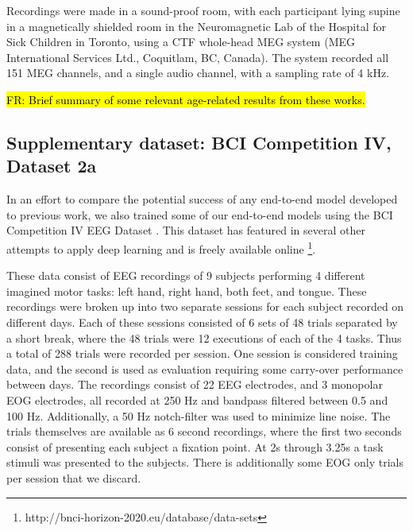 \documentclass[utf8]{frontiersSCNS} %
\newcommand{\FR}[1]{{\small \textcolor{red}{\hl{FR: #1}}}}
\begin{document}
Recordings were made in a sound-proof room, with each participant lying supine in a magnetically shielded room in the Neuromagnetic Lab of the Hospital for Sick Children in Toronto, using a CTF whole-head MEG system (MEG International Services Ltd., Coquitlam, BC, Canada). The system recorded all 151 MEG channels, and a single audio channel, with a sampling rate of 4 kHz.

\FR{Brief summary of some relevant age-related results from these works.}

\subsection{Supplementary dataset: BCI Competition IV, Dataset 2a}

In an effort to compare the potential success of any end-to-end model developed to previous work, we also trained some of our end-to-end models using the BCI Competition IV EEG Dataset \cite{Tangermann2012}. This dataset has featured in several other attempts to apply deep learning and is freely available online \footnote{http://bnci-horizon-2020.eu/database/data-sets}.

These data consist of EEG recordings of 9 subjects performing 4 different imagined motor tasks: left hand, right hand, both feet, and tongue. These recordings were broken up into two separate sessions for each subject recorded on different days. Each of these sessions consisted of 6 sets of 48 trials separated by a short break, where the 48 trials were 12 executions of each of the 4 tasks. Thus a total of 288 trials were recorded per session. One session is considered training data, and the second is used as evaluation requiring some carry-over performance between days. The recordings consist of 22 EEG electrodes, and 3 monopolar EOG electrodes, all recorded at 250 Hz and bandpass filtered between 0.5 and 100 Hz. Additionally, a 50 Hz notch-filter was used to minimize line noise. The trials themselves are available as 6 second recordings, where the first two seconds consist of presenting each subject a fixation point. At 2s through 3.25s a task stimuli was presented to the subjects. There is additionally some EOG only trials per session that we discard. %
\end{document}
